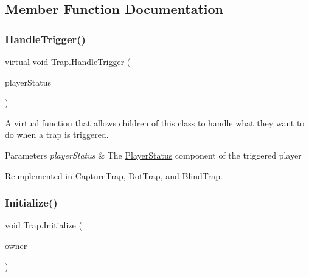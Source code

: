\subsection{Member Function Documentation}
\hypertarget{class_trap_a2e92a6f420a5d21a132108d8dd3ca5de}{}\label{class_trap_a2e92a6f420a5d21a132108d8dd3ca5de} 
\subsubsection{\texorpdfstring{Handle\+Trigger()}{HandleTrigger()}}
{\footnotesize\ttfamily virtual void Trap.\+Handle\+Trigger (\begin{DoxyParamCaption}\item[{\hyperlink{class_player_status}{Player\+Status}}]{player\+Status }\end{DoxyParamCaption})\hspace{0.3cm}{\ttfamily [virtual]}}



A virtual function that allows children of this class to handle what they want to do when a trap is triggered. 


\begin{DoxyParams}{Parameters}
{\em player\+Status} & The \hyperlink{class_player_status}{Player\+Status} component of the triggered player\\
\hline
\end{DoxyParams}


Reimplemented in \hyperlink{class_capture_trap_ac770502ec2d9a7e1fbc2ed4ce7f0ec8f}{Capture\+Trap}, \hyperlink{class_dot_trap_a40e21aaaf98d98cbf006a4c70d5d3809}{Dot\+Trap}, and \hyperlink{class_blind_trap_ac4e3be7b712921ae6510aca3be3ef428}{Blind\+Trap}.

\hypertarget{class_trap_a216acede3b7c562aaed5255bb33f6f98}{}\label{class_trap_a216acede3b7c562aaed5255bb33f6f98} 
\subsubsection{\texorpdfstring{Initialize()}{Initialize()}}
{\footnotesize\ttfamily void Trap.\+Initialize (\begin{DoxyParamCaption}\item[{\hyperlink{class_trap_spawner}{Trap\+Spawner}}]{owner }\end{DoxyParamCaption})}



